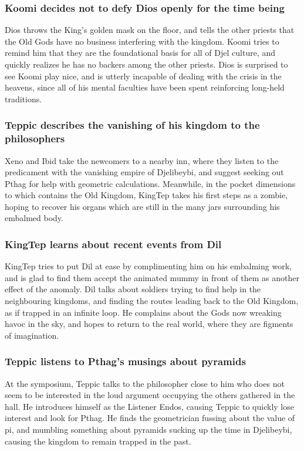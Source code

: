 \subsubsection{\Gls{Koomi} decides not to defy \Gls{Dios} openly for the time being}
\Gls{Dios} throws the King's golden mask on the floor, and tells the other priests that the Old
Gods have no business interfering with the kingdom. \Gls{Koomi} tries to remind him that they are
the foundational basis for all of Djel culture, and quickly realizes he has no backers among the
other priests. \Gls{Dios} is surprised to see \Gls{Koomi} play nice, and is utterly incapable of
dealing with the crisis in the heavens, since all of his mental faculties have been spent
reinforcing long-held traditions.

\subsubsection{\Gls{Teppic} describes the vanishing of his kingdom to the philosophers}
\Gls{Xeno} and \Gls{Ibid} take the newcomers to a nearby inn, where they listen to the predicament
with the vanishing empire of Djelibeybi, and suggest seeking out \Gls{Pthag} for help with
geometric calculations. Meanwhile, in the pocket dimensions to which contains the Old Kingdom,
\Gls{KingTep} takes his first steps as a zombie, hoping to recover his organs which are still in
the many jars surrounding his embalmed body.

\subsubsection{\Gls{KingTep} learns about recent events from \Gls{Dil}}
\Gls{KingTep} tries to put \Gls{Dil} at ease by complimenting him on his embalming work, and is
glad to find them accept the animated mummy in front of them as another effect of the anomaly.
\Gls{Dil} talks about soldiers trying to find help in the neighbouring kingdoms, and finding the
routes leading back to the Old Kingdom, as if trapped in an infinite loop. He complains about the
Gods now wreaking havoc in the sky, and hopes to return to the real world, where they are figments
of imagination.

\subsubsection{\Gls{Teppic} listens to \Gls{Pthag}'s musings about pyramids}
At the symposium, \Gls{Teppic} talks to the philosopher close to him who does not seem to be
interested in the loud argument occupying the others gathered in the hall. He introduces himself as
the Listener \Gls{Endos}, causing \Gls{Teppic} to quickly lose interest and look for \Gls{Pthag}.
He finds the geometrician fussing about the value of pi, and mumbling something about pyramids
sucking up the time in Djelibeybi, causing the kingdom to remain trapped in the past.

